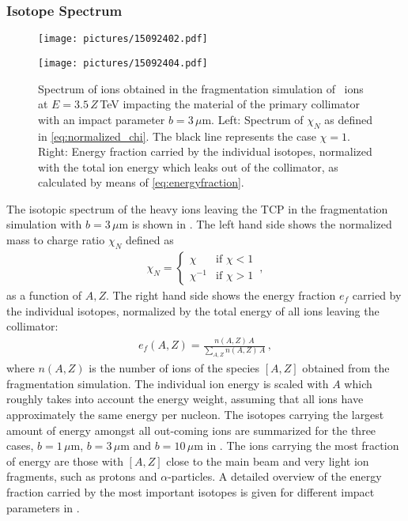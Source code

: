 \subsubsection{Isotope Spectrum}

\begin{figure*}[b]
  \begin{minipage}[t]{0.495\textwidth}
    \texttt{[image: pictures/15092402.pdf]}
  \end{minipage}
  \begin{minipage}[t]{0.495\textwidth}
    \texttt{[image: pictures/15092404.pdf]}
  \end{minipage}
  \caption{Spectrum of ions obtained in the fragmentation simulation of \lead~ions at $E=3.5\,Z\,$TeV impacting the material of the primary collimator with an impact parameter $b=3\,\mu$m. Left: Spectrum of $\chi_N$ as defined in \eqref{eq:normalized_chi}. The black line represents the case $\chi=1$. Right: Energy fraction carried by the individual isotopes, normalized with the total ion energy which leaks out of the collimator, as calculated by means of \eqref{eq:energyfraction}.}
  \label{fig:stier_fragmentation}
\end{figure*}

The isotopic spectrum of the heavy ions leaving the TCP in the fragmentation simulation with $b=3\,\mu$m is shown in . The left hand side shows the normalized mass to charge ratio $\chi_N$ defined as
\begin{align} 
  \chi_N=\begin{cases} \chi & \text{if } \chi<1 \\ \chi^{-1} & \text{if } \chi>1 \end{cases} \, , \label{eq:normalized_chi}
\end{align}
as a function of $A,Z$. The right hand side shows the energy fraction $e_f$ carried by the individual isotopes, normalized by the total energy of all ions leaving the collimator:
\begin{align}
e_f(A,Z) = \frac{n(A,Z) \, A }{\sum_{A,Z} n(A,Z) \, A} \,, \label{eq:energyfraction}
\end{align}
where $n(A,Z)$ is the number of ions of the species $[A,Z]$ obtained from the fragmentation simulation. The individual ion energy is scaled with $A$ which roughly takes into account the energy weight, assuming that all ions have approximately the same energy per nucleon. The isotopes carrying the largest amount of energy amongst all out-coming ions are summarized for the three cases, $b=1\,\mu$m, $b=3\,\mu$m and $b=10\,\mu$m in .
The ions carrying the most fraction of energy are those with $[A,Z]$ close to the main beam and very light ion fragments, such as protons and $\alpha$-particles. A detailed overview of the energy fraction carried by the most important isotopes is given for different impact parameters in .

